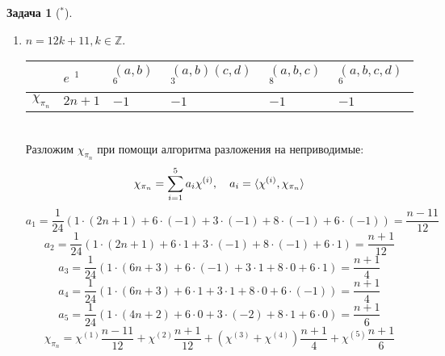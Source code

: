 \documentclass[12pt]{article}
\theoremstyle{definition}
\newtheorem{zad}{Задача}[section]
\begin{document}
\begin{zad}[$^*$]
\begin{itemize}
\begin{enumerate}
    \item $n=12k+11,k\in\mathbb{Z}$.
    \begin{table}[h!]
    \centering
    \begin{tabular}{|l|l|l|l|l|l|}
    \hline
     & $e$ $^1$ & $(a,b)$ $^6$ & $(a,b)(c,d)$ $^3$ & $(a,b,c)$ $^8$ & $(a,b,c,d)$ $^6$ \\ \hline
    $\chi_{\pi_n}$ & $2n+1$ & $-1$ & $-1$ & $-1$ & $-1$ \\ \hline
    \end{tabular}
    \end{table}\\
    Разложим $\chi_{\pi_n}$ при помощи алгоритма разложения на неприводимые:
    \begin{equation}
        \chi_{\pi_n}=\sum\limits_{i=1}^5 a_i\chi^{(i)},\quad a_i=\braket{\chi^{(i)},\chi_{\pi_n}}
    \end{equation}
    \begin{equation}
        a_1=\frac{1}{24}(1\cdot(2n+1)+6\cdot(-1)+3\cdot(-1)+8\cdot(-1)+6\cdot(-1))=\frac{n-11}{12}
    \end{equation}
    \begin{equation}
        a_2=\frac{1}{24}(1\cdot(2n+1)+6\cdot1+3\cdot(-1)+8\cdot(-1)+6\cdot1)=\frac{n+1}{12}
    \end{equation}
    \begin{equation}
        a_3=\frac{1}{24}(1\cdot(6n+3)+6\cdot(-1)+3\cdot1+8\cdot0+6\cdot1)=\frac{n+1}{4}
    \end{equation}
    \begin{equation}
        a_4=\frac{1}{24}(1\cdot(6n+3)+6\cdot1+3\cdot1+8\cdot0+6\cdot(-1))=\frac{n+1}{4}
    \end{equation}
    \begin{equation}
        a_5=\frac{1}{24}(1\cdot(4n+2)+6\cdot0+3\cdot(-2)+8\cdot1+6\cdot0)=\frac{n+1}{6}
    \end{equation}
    \begin{equation}
        \boxed{\chi_{\pi_n}=\chi^{(1)}\frac{n-11}{12}+\chi^{(2)}\frac{n+1}{12}+(\chi^{(3)}+\chi^{(4)})\frac{n+1}{4}+\chi^{(5)}\frac{n+1}{6}}
    \end{equation}
\end{enumerate}
\end{itemize}
\end{zad}
\end{document}
